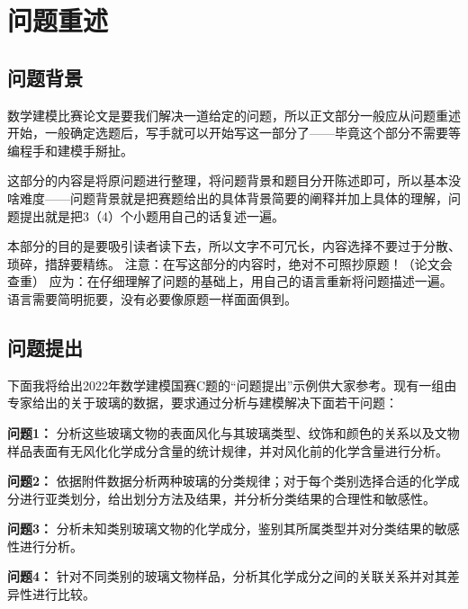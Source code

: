\section{问题重述}

\subsection{问题背景}

数学建模比赛论文是要我们解决一道给定的问题，所以正文部分一般应从问题重述开始，一般确定选题后，写手就可以开始写这一部分了——毕竟这个部分不需要等编程手和建模手掰扯。

这部分的内容是将原问题进行整理，将问题背景和题目分开陈述即可，所以基本没啥难度——问题背景就是把赛题给出的具体背景简要的阐释并加上具体的理解，问题提出就是把3（4）个小题用自己的话复述一遍。

本部分的目的是要吸引读者读下去，所以文字不可冗长，内容选择不要过于分散、琐碎，措辞要精练。
注意：在写这部分的内容时，绝对不可照抄原题！（论文会查重）
应为：在仔细理解了问题的基础上，用自己的语言重新将问题描述一遍。语言需要简明扼要，没有必要像原题一样面面俱到。


\subsection{问题提出}


下面我将给出2022年数学建模国赛C题的“问题提出”示例供大家参考。现有一组由专家给出的关于玻璃的数据，要求通过分析与建模解决下面若干问题：

\textbf{问题1：} 分析这些玻璃文物的表面风化与其玻璃类型、纹饰和颜色的关系以及文物样品表面有无风化化学成分含量的统计规律，并对风化前的化学含量进行分析。

\textbf{问题2：} 依据附件数据分析两种玻璃的分类规律；对于每个类别选择合适的化学成分进行亚类划分，给出划分方法及结果，并分析分类结果的合理性和敏感性。 

\textbf{问题3：} 分析未知类别玻璃文物的化学成分，鉴别其所属类型并对分类结果的敏感性进行分析。 

\textbf{问题4：} 针对不同类别的玻璃文物样品，分析其化学成分之间的关联关系并对其差异性进行比较。